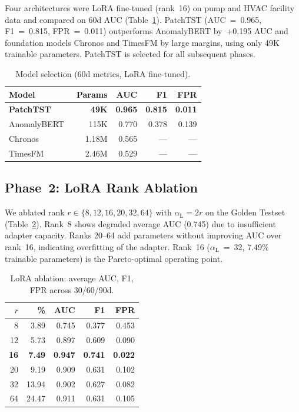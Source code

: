﻿\documentclass[twocolumn]{article}
\begin{document}
Four architectures were LoRA fine-tuned (rank~16) on pump and HVAC
facility data and compared on 60d AUC (Table~\ref{tab:model_select}).
PatchTST (AUC~=~0.965, F1~=~0.815, FPR~=~0.011) outperforms
AnomalyBERT by~+0.195 AUC and foundation models Chronos and TimesFM
by large margins, using only 49K trainable parameters.
PatchTST is selected for all subsequent phases.

\begin{table}
\centering
\caption{Model selection (60d metrics, LoRA fine-tuned).}
\label{tab:model_select}
\small
\renewcommand{\arraystretch}{1.05}
\setlength{\tabcolsep}{4pt}
\begin{tabular}{lrrrr}
\toprule
\textbf{Model} & \textbf{Params} & \textbf{AUC} & \textbf{F1} & \textbf{FPR} \\
\midrule
\rowcolor{green!10}
\textbf{PatchTST} & \textbf{49K} & \textbf{0.965} & \textbf{0.815} & \textbf{0.011} \\
AnomalyBERT~\cite{jeong2023anomalybert} & 115K & 0.770 & 0.378 & 0.139 \\
Chronos~\cite{ansari2024chronos} & 1.18M & 0.565 & --- & --- \\
TimesFM~\cite{das2024timesfm} & 2.46M & 0.529 & --- & --- \\
\bottomrule
\end{tabular}
\end{table}

\subsection{Phase~2: LoRA Rank Ablation}
\label{subsec:phase2}

We ablated rank $r \in \{8, 12, 16, 20, 32, 64\}$ with
$\alpha_\text{L} = 2r$ on the Golden Testset
(Table~\ref{tab:lora_ablation}).
Rank~8 shows degraded average AUC (0.745) due to insufficient
adapter capacity.
Ranks 20--64 add parameters without improving AUC over rank~16,
indicating overfitting of the adapter.
Rank~16 ($\alpha_\text{L}$~=~32, 7.49\% trainable parameters)
is the Pareto-optimal operating point.

\begin{table}
\centering
\caption{LoRA ablation: average AUC, F1, FPR across 30/60/90d.}
\label{tab:lora_ablation}
\small
\renewcommand{\arraystretch}{1.05}
\setlength{\tabcolsep}{4pt}
\begin{tabular}{rrrrr}
\toprule
$r$ & \textbf{\%} & \textbf{AUC} & \textbf{F1} & \textbf{FPR} \\
\midrule
8  & 3.89  & 0.745 & 0.377 & 0.453 \\
12 & 5.73 & 0.897 & 0.609 & 0.090 \\
\rowcolor{green!10}
\textbf{16} & \textbf{7.49} & \textbf{0.947} & \textbf{0.741} & \textbf{0.022} \\
20 & 9.19  & 0.909 & 0.631 & 0.102 \\
32 & 13.94 & 0.902 & 0.627 & 0.082 \\
64 & 24.47 & 0.911 & 0.631 & 0.105 \\
\bottomrule
\end{tabular}
\end{table}
\end{document}

